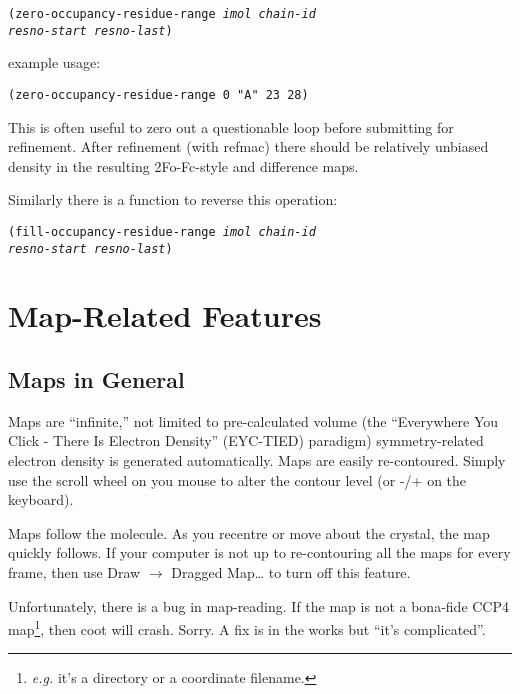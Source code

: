 \documentclass{book}
\begin{document}
\begin{trivlist}
\item \texttt{(zero-occupancy-residue-range \emph{imol chain-id \\
resno-start resno-last})}
\end{trivlist}

example usage:

\texttt{(zero-occupancy-residue-range 0 "A" 23 28)}

This is often useful to zero out a questionable loop before submitting
for refinement.  After refinement (with refmac) there should be
relatively unbiased density in the resulting 2Fo-Fc-style and
difference maps.

Similarly there is a function to reverse this operation:

\begin{trivlist}
\item \texttt{(fill-occupancy-residue-range \emph{imol chain-id \\
      resno-start resno-last})}
\end{trivlist}




\chapter{Map-Related Features}

\section{Maps in General}
Maps are ``infinite,'' not limited to pre-calculated volume (the
``Everywhere You Click - There Is Electron Density''
(EYC-TIED) paradigm) symmetry-related electron
density is generated automatically. Maps are easily re-contoured.
Simply use the scroll wheel on you mouse to alter the contour level
(or -/+ on the keyboard).
 
Maps follow the molecule.  As you recentre or move about the crystal,
the map quickly follows.  If your computer is not up to re-contouring
all the maps for every frame, then use \textsf{Draw $\rightarrow$
  Dragged Map\ldots} to turn off this feature.

Unfortunately, there is a bug in map-reading\label{map-reading-bug}.
If the map is not a bona-fide CCP4 map\footnote{\emph{e.g.} it's a
  directory or a coordinate filename.}, then coot will crash.  Sorry.
A fix is in the works but ``it's complicated''.
\end{document}
